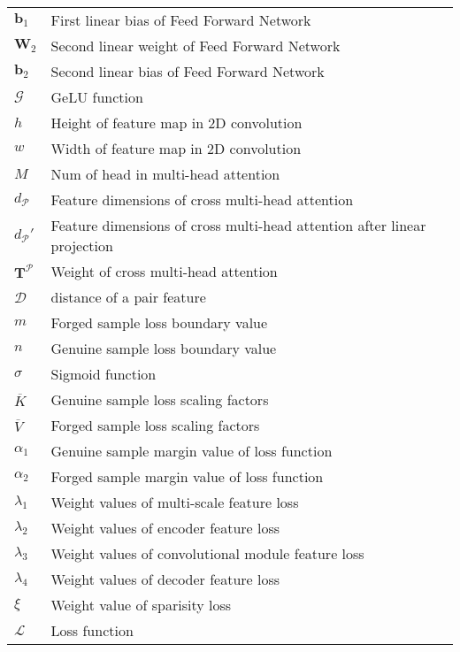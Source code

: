 \begin{tabular}{@{} l @{\hspace{3em}} l @{}}
    $\mathbf{b}_1$ & First linear bias of Feed Forward Network \\
    $\mathbf{W}_2$ & Second linear weight  of Feed Forward Network \\
    $\mathbf{b}_2$ & Second linear bias of Feed Forward Network \\
    $\mathcal{G}$ & GeLU function \\
    $h$ & Height of feature map in 2D convolution \\
    $w$ & Width of feature map in 2D convolution \\
    $M$ & Num of head in multi-head attention \\
    $d_{\mathcal{P}}$ & Feature dimensions of cross multi-head  attention \\
    $d_\mathcal{P}'$ & Feature dimensions of cross multi-head attention after linear projection \\ 
    $\mathbf{T}^\mathcal{P}$ & Weight of cross multi-head attention \\
    $\mathcal{D}$ & distance of a pair feature \\
    $m$ & Forged sample loss boundary value \\
    $n$ & Genuine sample loss boundary value \\
    $\sigma$ & Sigmoid function \\
    $\overline{K}$ & Genuine sample loss scaling factors \\
    $\overline{V}$ & Forged sample loss scaling factors \\
    $\alpha_1$ & Genuine sample margin value of loss function \\
    $\alpha_2$ & Forged sample margin value of loss function \\
    $\lambda_1$ & Weight values of multi-scale feature loss \\
    $\lambda_2$ & Weight values of encoder feature loss \\
    $\lambda_3$ & Weight values of convolutional module feature loss \\
    $\lambda_4$ & Weight values of decoder feature loss \\
    $\xi$ & Weight value of sparisity loss \\
    $\mathcal{L}$ & Loss function \\
\end{tabular}